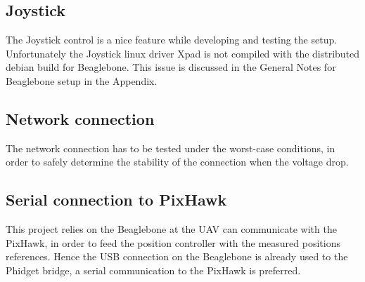 \subsection{Joystick}
The Joystick control is a nice feature while developing and testing the setup. Unfortunately the Joystick linux driver Xpad is not compiled with the distributed debian build for Beaglebone. This issue is discussed in the General Notes for Beaglebone setup in the Appendix. 

\subsection{Network connection}
The network connection has to be tested under the worst-case conditions, in order to safely determine the stability of the connection when the voltage drop.

\subsection{Serial connection to PixHawk}
This project relies on the Beaglebone at the UAV can communicate with the PixHawk, in order to feed the position controller with the measured positions references. Hence the USB connection on the Beaglebone is already used to the Phidget bridge, a serial communication to the PixHawk is preferred.

